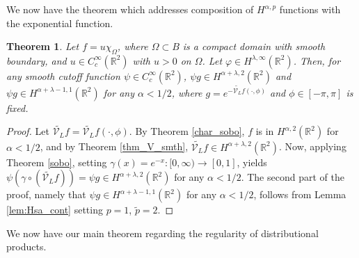 \documentclass[a4paper,12pt]{amsart}
\numberwithin{equation}{section}
\theoremstyle{plain}
\newtheorem{theorem}{Theorem}
\numberwithin{theorem}{section}
\theoremstyle{definition}
\theoremstyle{remark}
\theoremstyle{remark}
\theoremstyle{remark}
\newcommand{\paren}[1]{\left(#1\right)}               %
\begin{document}
We now have the theorem which addresses composition of $H^{\alpha,p}$ functions with the exponential function.


\begin{theorem}\label{thm_sep}
Let $f = u\chi_{\Omega}$, where $\Omega \subset B$ is a compact domain with smooth boundary, and $u \in C_c^\infty(\mathbb{R}^2)$ with $u > 0$ on $\Omega$. Let $\varphi\in H^{\lambda,\infty}(\mathbb{R}^2)$. Then, for any smooth cutoff function $\psi \in C_c^\infty(\mathbb{R}^2)$, $\psi g \in H^{\alpha + \lambda,2}(\mathbb{R}^2)$ and $\psi g \in H^{\alpha + \lambda - 1,1}(\mathbb{R}^2)$ for any $\alpha < 1/2$, where $g = e^{ -\widetilde{\mathcal{V}_L}f(\cdot, \phi) }$ and $\phi \in [-\pi, \pi]$ is fixed.
\end{theorem}
\begin{proof}
Let $\widetilde{\mathcal{V}_L}f = \widetilde{\mathcal{V}_L}f(\cdot, \phi)$. By Theorem \ref{char_sobo}, $f$ is in $H^{\alpha,2}(\mathbb{R}^2)$ for $\alpha <1/2$, and by Theorem \ref{thm_V_smth}, $\widetilde{\mathcal{V}_L}f \in H^{\alpha + \lambda,2}(\mathbb{R}^2)$. Now, applying Theorem \ref{sobo}, setting $\gamma(x) = e^{-x} : [0,\infty) \to [0,1]$, yields $\psi \paren{ \gamma \circ \paren{ \widetilde{\mathcal{V}_L}f } }= \psi g\in H^{\alpha + \lambda,2}(\mathbb{R}^2)$ for any $\alpha < 1/2$. The second part of the proof, namely that $\psi g \in H^{\alpha + \lambda - 1,1}(\mathbb{R}^2)$ for any $\alpha < 1/2$, follows from Lemma \ref{lem:Hsa_cont} setting $p = 1$, $\tilde{p} = 2$.
\end{proof}

\noindent We now have our main theorem regarding the regularity of distributional products.
\end{document}
